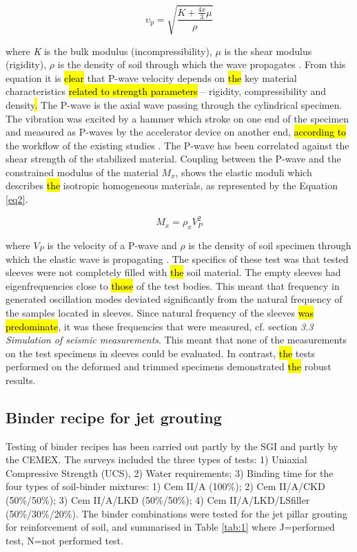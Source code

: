 \documentclass[USenglish,twocolumn]{article}
\begin{document}
\begin{equation} \label{eq2}
	\upsilon_p=\sqrt{\frac{K+\frac{4x}{3}\mu}{\rho} }
\end{equation}

where \emph{K} is the bulk modulus (incompressibility), $\mu$ is the shear modulus (rigidity), $\rho$ is the density of soil through which the wave propagates \cite{Fowler}. From this equation it is \hl{clear} that P-wave velocity depends on \hl{the} key material characteristics \hl{related to strength parameters }-- rigidity, compressibility and density\hl{. }The P-wave is the axial wave passing through the cylindrical specimen. The vibration was excited by a hammer which stroke on one end of the specimen and measured as P-waves by the accelerator device on another end, \hl{according to} the workflow of the existing studies \cite{ma15217798}. The P-wave has been correlated against the shear strength of the stabilized material. Coupling between the P-wave and the constrained modulus of the material $M_x$, shows the elastic moduli which describes \hl{the} isotropic homogeneous materials, as represented by the Equation \ref{eq2}.

\begin{equation} \label{eq2}
	M_x=\rho_x V_P^2
\end{equation}

where $V_P$ is the velocity of a P-wave and $\rho$ is the density of soil specimen through which the elastic wave is propagating \cite{Mavko}. The specifics of these test was that\hl{ }tested sleeves were not completely filled with \hl{the} soil material. The empty sleeves had eigenfrequencies close to \hl{those} of the test bodies. This meant that\hl{ }frequency in generated oscillation modes deviated significantly from the natural frequency of the samples located in sleeves. Since\hl{ }natural frequency of the sleeves \hl{was predominate}, it was these frequencies that were measured, cf. section \emph{3.3 Simulation of seismic measurements}. This meant that none of the measurements on the test specimens in sleeves could be evaluated. In contrast, \hl{the} tests performed on the deformed and trimmed specimens demonstrated \hl{the }robust results.

\subsection{Binder recipe for jet grouting}
Testing of\hl{ }binder recipes has been carried out partly by the SGI and partly by the CEMEX. The surveys included the three types of tests: 1) Uniaxial Compressive Strength (UCS), 2) Water requirements; 3) Binding time for the four types of soil-binder mixtures: 1) Cem II/A (100\%); 2) Cem II/A/CKD (50\%/50\%); 3) Cem II/A/LKD (50\%/50\%); 4) Cem II/A/LKD/LSfiller (50\%/30\%/20\%). The binder combinations were tested for the jet pillar grouting for reinforcement of soil, and summarised in Table \ref{tab:1} where J=performed test, N=not performed test.
\end{document}
